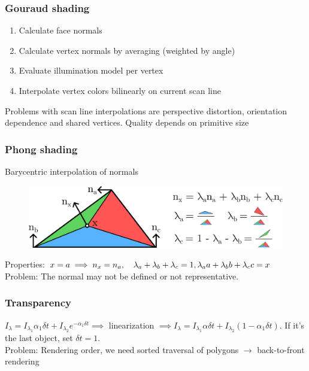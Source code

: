 \documentclass[a4paper,10pt]{article}
\begin{document}
\subsubsection{Gouraud shading}
\begin{enumerate}
    \item Calculate face normals
    \item Calculate vertex normals by averaging (weighted by angle)
    \item Evaluate illumination model per vertex
    \item Interpolate vertex colors bilinearly on current scan line
\end{enumerate}
Problems with scan line interpolations are perspective distortion, orientation dependence and shared vertices. Quality depends on primitive size

\subsubsection{Phong shading} Barycentric interpolation of normals\\
\begin{figure}[h]
    \includegraphics[width=\linewidth]{phong-shading.png}
\end{figure}

\noindent Properties: \( x = a \implies n_x = n_a, \quad \lambda_a+\lambda_b +\lambda_c = 1, \\ \lambda_a a+ \lambda_b b + \lambda_c c = x \)
Problem: The normal may not be defined or not representative.

\subsubsection{Transparency} \( I_\lambda = I_{\lambda_1} \alpha_1 \delta t + I_{\lambda_2} e^{-\alpha_1 \delta t} \implies \) linearization \( \implies I_\lambda = I_{\lambda_1} \alpha \delta t + I_{\lambda_2} (1-\alpha_1 \delta t) \). If it's the last object, set \( \delta t = 1 \). \\
Problem: Rendering order, we need sorted traversal of polygons \( \to  \) back-to-front rendering
\end{document}
